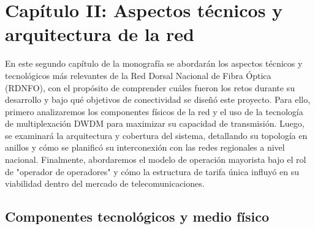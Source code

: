 \section{Capítulo II: Aspectos técnicos y arquitectura de la red}
En este segundo capítulo de la monografía se abordarán los aspectos técnicos y tecnológicos más relevantes de la Red Dorsal Nacional de Fibra Óptica (RDNFO), con el propósito de comprender cuáles fueron los retos durante su desarrollo y bajo qué objetivos de conectividad se diseñó este proyecto. Para ello, primero analizaremos los componentes físicos de la red y el uso de la tecnología de multiplexación DWDM para maximizar su capacidad de transmisión. Luego, se examinará la arquitectura y cobertura del sistema, detallando su topología en anillos y cómo se planificó su interconexión con las redes regionales a nivel nacional. Finalmente, abordaremos el modelo de operación mayorista bajo el rol de "operador de operadores" y cómo la estructura de tarifa única influyó en su viabilidad dentro del mercado de telecomunicaciones.
\subsection{Componentes tecnológicos y medio físico}
